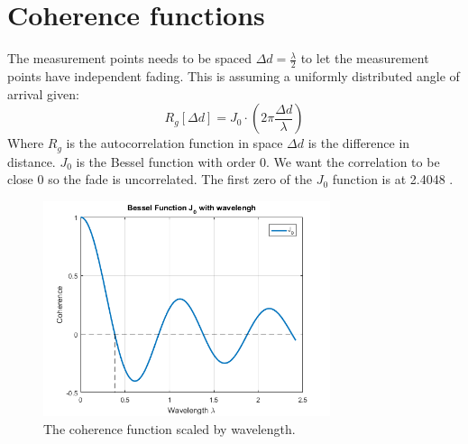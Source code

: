 

\section{Coherence functions}
The measurement points needs to be spaced $\Delta d = \frac{\lambda}{2}$ to let the measurement points have independent fading. This is assuming a uniformly distributed angle of arrival given:
\begin{equation}
R_g[\Delta d] = J_0\cdot(2\pi \frac{\Delta d}{\lambda})
\end{equation}
Where $R_g$ is the autocorrelation function in space $\Delta d$ is the difference in distance. $J_0$ is the Bessel function with order 0.
We want the correlation to be close 0 so the fade is uncorrelated. The first zero of the $J_0$ function is at 2.4048 \citep[p.335]{Jakes_microwave}.

\begin{figure}[H]
\centering
\includegraphics[width=0.75\textwidth]{figures/Bessel_wavlength.png}
\caption{The coherence function scaled by wavelength.}
\label{bessel_wave}
\end{figure}


